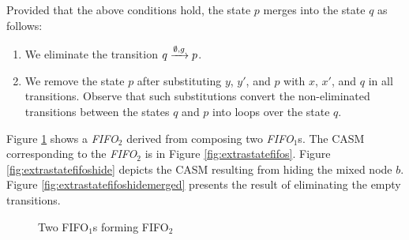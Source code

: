 Provided that the above conditions hold, the state $p$ merges into the state $q$ as follows:
\begin{enumerate}
 \item We eliminate the transition $q\xrightarrow{\emptyset, g}p$. 
 \item We remove the state $p$ after substituting $y$, $y'$, and $p$ with $x$, $x'$, and $q$ in all transitions. Observe that such substitutions convert the non-eliminated transitions between the states $q$ and $p$ into loops over the state $q$.
 \end{enumerate}
\begin{BehExample}
\label{ex:bisimfifos}
Figure \ref{fig:example2fifos} shows a \emph{FIFO$_2$} derived from composing two \emph{FIFO$_1$}s. The CASM corresponding to the \emph{FIFO$_2$} is in Figure \ref{fig:extrastatefifos}. Figure \ref{fig:extrastatefifoshide} depicts the CASM resulting from hiding the mixed node $b$. Figure \ref{fig:extrastatefifoshidemerged} presents the result of eliminating the empty transitions.

\begin{figure}[t]
  \centering
  \caption{Two FIFO$_1$s forming FIFO$_2$}
  \label{fig:example2fifos}
\end{figure}
\end{BehExample}

